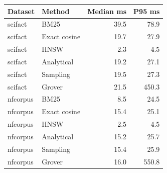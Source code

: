 \begin{tabular}{llrr}
\toprule
Dataset & Method & Median ms & P95 ms\\
\midrule
scifact & BM25 & 39.5 & 78.9\\
scifact & Exact cosine & 19.7 & 27.9\\
scifact & HNSW & 2.3 & 4.5\\
scifact & Analytical & 19.2 & 27.1\\
scifact & Sampling & 19.5 & 27.3\\
scifact & Grover & 21.5 & 450.3\\
nfcorpus & BM25 & 8.5 & 24.5\\
nfcorpus & Exact cosine & 15.4 & 25.1\\
nfcorpus & HNSW & 2.5 & 4.5\\
nfcorpus & Analytical & 15.2 & 25.7\\
nfcorpus & Sampling & 15.4 & 25.9\\
nfcorpus & Grover & 16.0 & 550.8\\
\bottomrule
\end{tabular}
